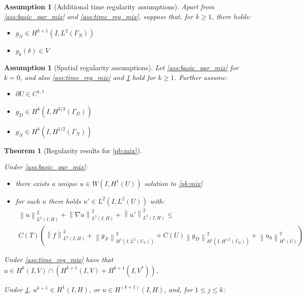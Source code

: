 \documentclass[english,a4paper,9pt,oneside]{scrbook}	%
\theoremstyle{break}
\newtheorem{thm}[equation]{Theorem}
\newtheorem{ass}[equation]{Assumption}
\theoremstyle{remark}
\newcommand{\norm}[1]{\left\lVert#1\right\rVert}
\begin{document}
\begin{appendices}
\begin{ass}[Additional time regularity assumptions]
\label{ass:add_time_reg_mix}
Apart from \cref{ass:basic_par_mix} and \cref{ass:time_reg_mix}, suppose that, for $k\geq 1$, there holds:

\begin{itemize}
	\item $g_N \in H^{k+1}(I, L^2(\Gamma_N))$
	\item $g_k(\delta)  \in V$
\end{itemize} 
\end{ass}


\begin{ass}[Spatial regularity assumptions]
\label{ass:space_reg_mix}
Let \cref{ass:basic_par_mix} for $k=0$, and also \cref{ass:time_reg_mix} and \cref{ass:add_time_reg_mix} hold for $k\geq 1$. Further assume:

\begin{itemize}
	\item $\partial U \in C^{1,1}$
	\item $g_D \in H^k(I,H^{3/2}(\Gamma_D))$
	\item $g_N \in H^k(I,H^{1/2}(\Gamma_N))$
\end{itemize}

\end{ass}


\begin{thm}[Regularity results for \cref{pb:mix}]
\label{thm:mix_reg}

Under \cref{ass:basic_par_mix}:

\begin{itemize}
	\item there exists a unique $u \in W(I,H^1(U))$ solution to \cref{pb:mix}
	\item for such $u$ there holds $u' \in L^2(I,L^2(U))$ with:
	\begin{align*}
	\norm{u}^2_{L^2(I,H)}+\norm{\nabla u}^2_{L^2(I,H)} + \norm{u'}^2_{L^2(I,H)} \leq \\
	C(T)\left (  \norm{f}_{L^2(I,H)}^2 +  \norm{g_N}^2_{H^1(I,L^2(\Gamma_N))}   + C(U) \norm{g_D}^2_{H^1(I,H^{1/2}(\Gamma_D))} + \norm{u_0}^2_{H^1(U)}\right )
\end{align*}
\end{itemize}

Under \cref{ass:time_reg_mix} have that $u \in H^k(I,V)\cap ( H^{k+1}(I,V) + H^{k+1}(I,V^*))$.


Under \cref{ass:add_time_reg_mix}, $u^{k+1} \in H^1(I,H)$, or $u \in H^{(k+1)}(I,H)$, and, for $1\leq j \leq k$:


\end{thm}
\end{appendices}
\end{document}
